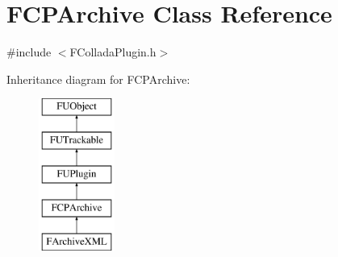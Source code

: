 \hypertarget{classFCPArchive}{
\section{FCPArchive Class Reference}
\label{classFCPArchive}
}


{\ttfamily \#include $<$FColladaPlugin.h$>$}

Inheritance diagram for FCPArchive:\begin{figure}[H]
\begin{center}
\leavevmode
\includegraphics[height=5.000000cm]{classFCPArchive}
\end{center}
\end{figure}

